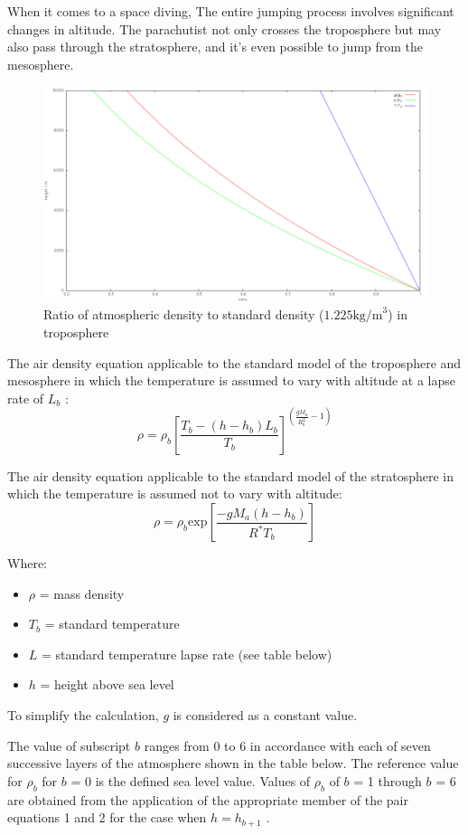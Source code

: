 \documentclass[12pt]{article}
\begin{document}
When it comes to a space diving, The entire jumping process involves significant changes in altitude. The parachutist not only 
crosses the troposphere but may also pass through the stratosphere, and it's even possible to jump from the mesosphere.


\begin{figure}[!hbtp]
    \centering 
    \includegraphics[width = 0.6\linewidth]{image/007.png}
    \caption{Ratio of atmospheric density to standard density ($ 1.225 \text{kg/m}^3$) in troposphere\cite{enwiki:1181726796}}
\end{figure}

The air density equation applicable to the standard model of the troposphere and mesosphere in which the temperature is 
assumed to vary with altitude at a lapse rate of $L_b$ \cite{enwiki:1179305813}:
\[ \rho = \rho_b\left[ \frac{T_b - (h - h_b)L_b}{T_b}\right]^{\left( \frac{gM_a}{R^L_b} - 1\right)}\]

The air density equation applicable to the standard model of the stratosphere 
in which the temperature is assumed not to vary with altitude\cite{enwiki:1179305813}:
\[ \rho =  \rho_b \text{exp}\left[\frac{-gM_a(h - h_b)}{R^*T_b}\right]\]

Where:
\begin{itemize}
    \item $\rho $ = mass density 
    \item $T_{b}$ = standard temperature 
    \item $L$ = standard temperature lapse rate (see table below) 
    \item $h$ = height above sea level
\end{itemize}

To simplify the calculation, $g$ is considered as a constant value.

The value of subscript $b$ ranges from 0 to 6 in accordance with each of seven successive layers 
of the atmosphere shown in the table below. The reference value for $\rho_b$ for $b$ = 0 is the defined 
sea level value. Values of $\rho_b$ of $b$ = 1 through $b$ = 6
are obtained from the application of the appropriate member of the pair equations 
1 and 2 for the case when $h = h_{b+1}$ \cite{usatmosphere1976}.
\end{document}
